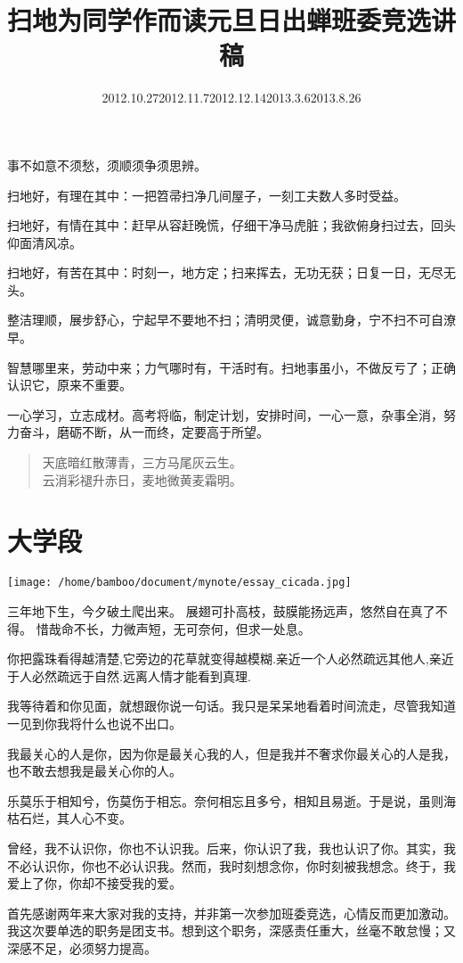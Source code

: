 \documentclass{article}
\begin{document}
事不如意不须愁，须顺须争须思辨。
\title{扫地\footnotesize 为同学作而读}
扫地好，有理在其中：一把笤帚扫净几间屋子，一刻工夫数人多时受益。
\par 扫地好，有情在其中：赶早从容赶晚慌，仔细干净马虎脏；我欲俯身扫过去，回头仰面清风凉。
\par  扫地好，有苦在其中：时刻一，地方定；扫来挥去，无功无获；日复一日，无尽无头。
\par 整洁理顺，展步舒心，宁起早不要地不扫；清明灵便，诚意勤身，宁不扫不可自潦早。
\par 智慧哪里来，劳动中来；力气哪时有，干活时有。扫地事虽小，不做反亏了；正确认识它，原来不重要。
\par 一心学习，立志成材。高考将临，制定计划，安排时间，一心一意，杂事全消，努力奋斗，磨砺不断，从一而终，定要高于所望。
\title{元旦日出}
\begin{verse}
天底暗红散薄青，三方马尾灰云生。\\
云消彩褪升赤日，麦地微黄麦霜明。\\
\end{verse}

\section{大学段}
\texttt{[image: /home/bamboo/document/mynote/essay\_cicada.jpg]}
\title{蝉}
三年地下生，今夕破土爬出来。
展翅可扑高枝，鼓膜能扬远声，悠然自在真了不得。
惜哉命不长，力微声短，无可奈何，但求一处息。

你把露珠看得越清楚,它旁边的花草就变得越模糊.亲近一个人必然疏远其他人,亲近于人必然疏远于自然.远离人情才能看到真理.\date{2012.10.27}

我等待着和你见面，就想跟你说一句话。我只是呆呆地看着时间流走，尽管我知道一见到你我将什么也说不出口。\date{2012.11.7}

我最关心的人是你，因为你是最关心我的人，但是我并不奢求你最关心的人是我，也不敢去想我是最关心你的人。\date{2012.12.14}

乐莫乐于相知兮，伤莫伤于相忘。奈何相忘且多兮，相知且易逝。于是说，虽则海枯石烂，其人心不变。
\date{2013.3.6}

曾经，我不认识你，你也不认识我。后来，你认识了我，我也认识了你。其实，我不必认识你，你也不必认识我。然而，我时刻想念你，你时刻被我想念。终于，我爱上了你，你却不接受我的爱。
\date{2013.8.26}

\title{班委竞选讲稿}
首先感谢两年来大家对我的支持，并非第一次参加班委竞选，心情反而更加激动。我这次要单选的职务是团支书。想到这个职务，深感责任重大，丝毫不敢怠慢；又深感不足，必须努力提高。
\end{document}
